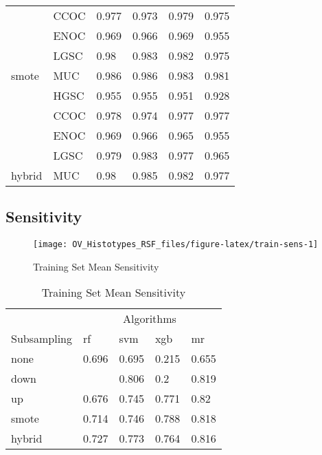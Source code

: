 \documentclass[
]{report}
\begin{document}
\begin{table}
\begin{tabular}[t]{l|l|l|l|l|l}
 & CCOC & 0.977 & 0.973 & 0.979 & 0.975\\
\cline{2-6}
 & ENOC & 0.969 & 0.966 & 0.969 & 0.955\\
\cline{2-6}
 & LGSC & 0.98 & 0.983 & 0.982 & 0.975\\
\cline{2-6}
\multirow{-5}{*}{\raggedright\arraybackslash smote} & MUC & 0.986 & 0.986 & 0.983 & 0.981\\
\cline{1-6}
 & HGSC & 0.955 & 0.955 & 0.951 & 0.928\\
\cline{2-6}
 & CCOC & 0.978 & 0.974 & 0.977 & 0.977\\
\cline{2-6}
 & ENOC & 0.969 & 0.966 & 0.965 & 0.955\\
\cline{2-6}
 & LGSC & 0.979 & 0.983 & 0.977 & 0.965\\
\cline{2-6}
\multirow{-5}{*}{\raggedright\arraybackslash hybrid} & MUC & 0.98 & 0.985 & 0.982 & 0.977\\
\hline
\end{tabular}
\end{table}

\subsection{Sensitivity}\label{sensitivity-1}

\begin{figure}[H]

{\centering \texttt{[image: OV\_Histotypes\_RSF\_files/figure-latex/train-sens-1]} 

}

\caption{Training Set Mean Sensitivity}\label{fig:train-sens}
\end{figure}

\begin{table}

\caption{\label{tab:train-sens-table}Training Set Mean Sensitivity}
\centering
\begin{tabular}[t]{l|l|l|l|l}
\hline
\multicolumn{1}{c|}{ } & \multicolumn{4}{c}{Algorithms} \\
\cline{2-5}
Subsampling & rf & svm & xgb & mr\\
\hline
none & 0.696 & 0.695 & 0.215 & 0.655\\
\hline
down & \cellcolor[HTML]{90ee90}{0.826} & 0.806 & 0.2 & 0.819\\
\hline
up & 0.676 & 0.745 & 0.771 & 0.82\\
\hline
smote & 0.714 & 0.746 & 0.788 & 0.818\\
\hline
hybrid & 0.727 & 0.773 & 0.764 & 0.816\\
\hline
\end{tabular}
\end{table}
\end{document}
